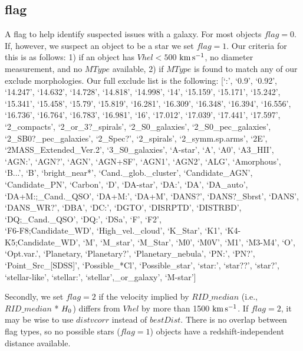 \documentclass[twocolumn,tighten]{aastex62}
\newcommand{\kms}{$\rm km\, s^{-1}$}
\begin{document}
\subsection{flag} \label{flag}
A flag to help identify suspected issues with a galaxy. For most objects $flag=0$. If, however, we suspect an object to be a star we set $flag=1$. Our criteria for this is as follows: 1) if an object has $Vhel < 500$ \kms, no diameter measurement, and no $MType$ available, 2) if $MType$ is found to match any of our exclude morphologies. Our full exclude list is the following: [`:', `0.9', `0.92', `14.247', `14.632', `14.728', `14.818', `14.998', `14', `15.159', `15.171', `15.242', `15.341', `15.458', `15.79', `15.819', `16.281', `16.309', `16.348', `16.394', `16.556', `16.736', `16.764', `16.783', `16.981', `16', `17.012', `17.039', `17.441', `17.597', `2\_compacts', `2\_or\_3?\_spirals', `2\_S0\_galaxies', `2\_S0\_pec\_galaxies', `2\_SB0?\_pec\_galaxies', `2\_Spec?', `2\_spirals', `2\_symm.sp.arms', `2E', `2MASS\_Extended\_Ver.2', `3\_S0\_galaxies', `A-star', `A', `A0', `A3\_HII', `AGN:', `AGN?', `AGN', `AGN+SF', `AGN1', `AGN2', `ALG', `Amorphous', `B...', `B', `bright\_near*', `Cand.\_glob.\_cluster', `Candidate\_AGN', `Candidate\_PN', `Carbon', `D', `DA-star', `DA:', `DA', `DA\_auto', `DA+M:;\_Cand.\_QSO', `DA+M:', `DA+M', `DANS?', `DANS?\_Sbrst', `DANS', `DANS\_WR?', `DBA', `DC:', `DGTO', `DISRPTD', `DISTRBD', `DQ;\_Cand.\_QSO', `DQ:', `DSa', `F', `F2', \\ `F6-F8;Candidate\_WD', `High\_vel.\_cloud', `K\_Star', `K1', `K4-K5;Candidate\_WD', `M', `M\_star', `M\_Star', `M0', `M0V', `M1', `M3-M4', `O', `Opt.var.', `Planetary, `Planetary?', `Planetary\_nebula', `PN:', `PN?', `Point\_Src\_[SDSS]', `Possible\_*Cl', `Possible\_star', `star:', `star??', `star?', `stellar-like', `stellar:', `stellar',\_or\_galaxy', `M-star']


Secondly, we set $flag = 2$ if the velocity implied by $RID\_median$ (i.e., $RID\_median$ * $H_{\rm 0}$) differs from $Vhel$ by more than 1500 \kms. If $flag = 2$, it may be wise to use $distvcorr$ instead of $bestDist$. There is no overlap between flag types, so no possible stars ($flag=1$) objects have a redshift-independent distance available.
\end{document}

